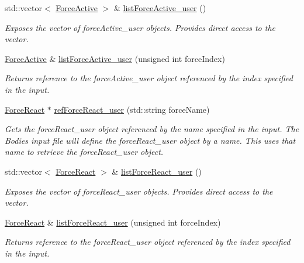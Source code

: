 \begin{DoxyCompactItemize}
std\-::vector$<$ \hyperlink{classosea_1_1ofreq_1_1_force_active}{Force\-Active} $>$ \& \hyperlink{classosea_1_1ofreq_1_1_system_ac50ce91b4ad00fd7748c316ba5fe70a6}{list\-Force\-Active\-\_\-user} ()
\begin{DoxyCompactList}\small\item\em Exposes the vector of force\-Active\-\_\-user objects. Provides direct access to the vector. \end{DoxyCompactList}\item 
\hyperlink{classosea_1_1ofreq_1_1_force_active}{Force\-Active} \& \hyperlink{classosea_1_1ofreq_1_1_system_a6166a2799a6b6419f5a91d90c98851a5}{list\-Force\-Active\-\_\-user} (unsigned int force\-Index)
\begin{DoxyCompactList}\small\item\em Returns reference to the force\-Active\-\_\-user object referenced by the index specified in the input. \end{DoxyCompactList}\item 
\hyperlink{classosea_1_1ofreq_1_1_force_react}{Force\-React} $\ast$ \hyperlink{classosea_1_1ofreq_1_1_system_ac48c0f72ebfc7399e9c8d9d95bb9876c}{ref\-Force\-React\-\_\-user} (std\-::string force\-Name)
\begin{DoxyCompactList}\small\item\em Gets the force\-React\-\_\-user object referenced by the name specified in the input. The Bodies input file will define the force\-React\-\_\-user object by a name. This uses that name to retrieve the force\-React\-\_\-user object. \end{DoxyCompactList}\item 
std\-::vector$<$ \hyperlink{classosea_1_1ofreq_1_1_force_react}{Force\-React} $>$ \& \hyperlink{classosea_1_1ofreq_1_1_system_a5f567e325139744bc80fd1653b50b0e3}{list\-Force\-React\-\_\-user} ()
\begin{DoxyCompactList}\small\item\em Exposes the vector of force\-React\-\_\-user objects. Provides direct access to the vector. \end{DoxyCompactList}\item 
\hyperlink{classosea_1_1ofreq_1_1_force_react}{Force\-React} \& \hyperlink{classosea_1_1ofreq_1_1_system_a863fea51fba8362e69486bdfdf632ccb}{list\-Force\-React\-\_\-user} (unsigned int force\-Index)
\begin{DoxyCompactList}\small\item\em Returns reference to the force\-React\-\_\-user object referenced by the index specified in the input. \end{DoxyCompactList}\item 

\end{DoxyCompactItemize}
